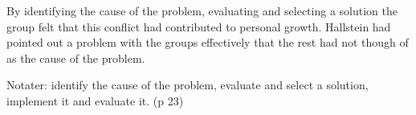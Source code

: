 By identifying the cause of the problem, evaluating and selecting a solution the group felt that this conflict had contributed to personal growth. Hallstein had pointed out a problem with the groups effectively that the rest had not though of as the cause of the problem. 



Notater:
identify the cause of the problem, evaluate and select a solution, implement it and evaluate it. (p 23) 

